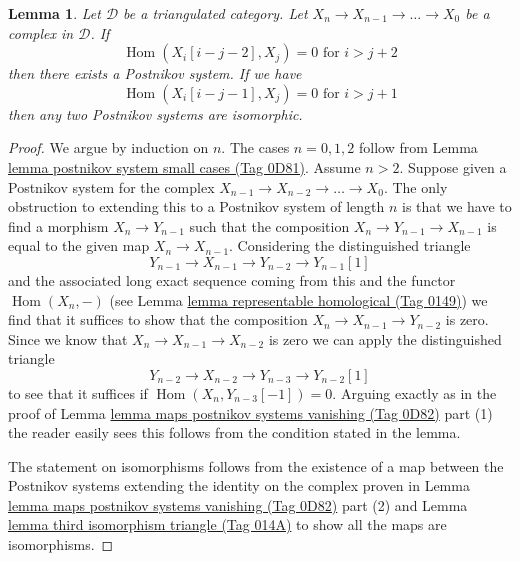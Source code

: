 \documentclass{amsart}
\theoremstyle{plain}
\newtheorem{lemma}[subsection]{Lemma}
\theoremstyle{definition}
\theoremstyle{remark}
\numberwithin{equation}{subsection}
\def\Hom{\mathop{\mathrm{Hom}}\nolimits}
\begin{document}
\begin{lemma}
\label{lemma-existence-postnikov-system}
Let $\mathcal{D}$ be a triangulated category.
Let $X_n \to X_{n - 1} \to \ldots \to X_0$ be
a complex in $\mathcal{D}$. If
$$
\Hom(X_i[i - j - 2], X_j) = 0 \text{ for }i > j + 2
$$
then there exists a Postnikov system. If we have
$$
\Hom(X_i[i - j - 1], X_j) = 0 \text{ for }i > j + 1
$$
then any two Postnikov systems are isomorphic.
\end{lemma}

\begin{proof}
We argue by induction on $n$. The cases $n = 0, 1, 2$
follow from Lemma \href{https://stacks.math.columbia.edu/tag/0D81}{lemma postnikov system small cases (Tag 0D81)}.
Assume $n > 2$.
Suppose given a Postnikov system for the complex
$X_{n - 1} \to X_{n - 2} \to \ldots \to X_0$.
The only obstruction to extending this to a Postnikov system
of length $n$ is that we have to find a morphism
$X_n \to Y_{n - 1}$ such that the composition
$X_n \to Y_{n - 1} \to X_{n - 1}$ is equal to the given map
$X_n \to X_{n - 1}$. Considering the distinguished triangle
$$
Y_{n - 1} \to X_{n - 1} \to Y_{n - 2} \to Y_{n - 1}[1]
$$
and the associated long exact sequence coming from this
and the functor $\Hom(X_n, -)$
(see Lemma \href{https://stacks.math.columbia.edu/tag/0149}{lemma representable homological (Tag 0149)})
we find that it suffices to show that the composition
$X_n \to X_{n - 1} \to Y_{n - 2}$ is zero.
Since we know that $X_n \to X_{n - 1} \to X_{n - 2}$ is zero
we can apply the distinguished triangle
$$
Y_{n - 2} \to X_{n - 2} \to Y_{n - 3} \to Y_{n - 2}[1]
$$
to see that it suffices if $\Hom(X_n, Y_{n - 3}[-1]) = 0$.
Arguing exactly as in the proof of
Lemma \href{https://stacks.math.columbia.edu/tag/0D82}{lemma maps postnikov systems vanishing (Tag 0D82)} part (1)
the reader easily sees this follows from the condition
stated in the lemma.

\medskip\noindent
The statement on isomorphisms follows from the existence of a map
between the Postnikov systems extending the identity on the complex
proven in Lemma \href{https://stacks.math.columbia.edu/tag/0D82}{lemma maps postnikov systems vanishing (Tag 0D82)} part (2)
and Lemma \href{https://stacks.math.columbia.edu/tag/014A}{lemma third isomorphism triangle (Tag 014A)} to show all the maps are
isomorphisms.
\end{proof}
\end{document}
